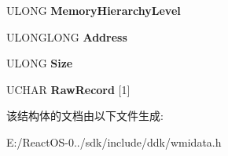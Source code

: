 \begin{DoxyCompactItemize}
U\+L\+O\+NG {\bfseries Memory\+Hierarchy\+Level}
\item 
\mbox{\label{struct___m_s_m_c_a_event___t_l_b_error_a507e27c625d127090234a8a00fb1136d}} 
U\+L\+O\+N\+G\+L\+O\+NG {\bfseries Address}
\item 
\mbox{\label{struct___m_s_m_c_a_event___t_l_b_error_a1998cec565e9b43bd442e6702f7405ea}} 
U\+L\+O\+NG {\bfseries Size}
\item 
\mbox{\label{struct___m_s_m_c_a_event___t_l_b_error_ad1f41213de0f31e7300e23c1cd02f26c}} 
U\+C\+H\+AR {\bfseries Raw\+Record} \mbox{[}1\mbox{]}
\end{DoxyCompactItemize}


该结构体的文档由以下文件生成\+:\begin{DoxyCompactItemize}
\item 
E\+:/\+React\+O\+S-\/0../sdk/include/ddk/wmidata.\+h\end{DoxyCompactItemize}
